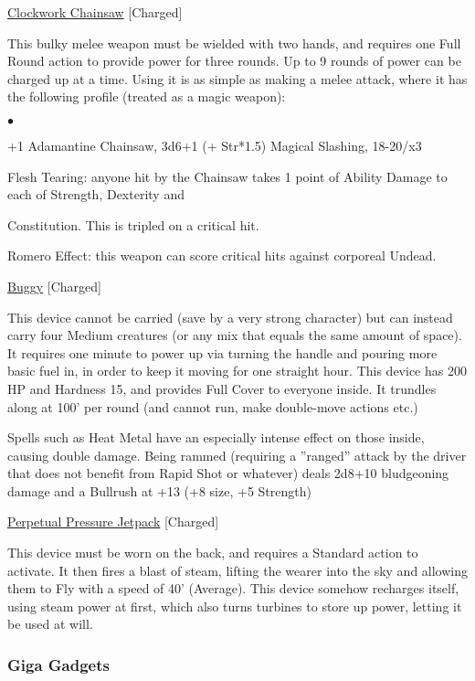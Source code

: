 \medskip\noindent\underline{Clockwork Chainsaw} [Charged] 

\noindent This bulky melee weapon must be wielded with two hands, and requires one Full Round action to provide power for three rounds. Up to 9 rounds of power can be charged up at a time. Using it is as simple as making a melee attack, where it has the following profile (treated as a magic weapon): 

\begin{list}{$\bullet$}{\itemspace}
\item +1 Adamantine Chainsaw, 3d6+1 (+ Str*1.5) Magical Slashing, 18-20/x3 
\item Flesh Tearing: anyone hit by the Chainsaw takes 1 point of Ability Damage to each of Strength, Dexterity and \item Constitution. This is tripled on a critical hit. 
\item Romero Effect: this weapon can score critical hits against corporeal Undead. 
\end{list}

\medskip\noindent\underline{Buggy} [Charged] 

\noindent This device cannot be carried (save by a very strong character) but can instead carry four Medium creatures (or any mix that equals the same amount of space). It requires one minute to power up via turning the handle and pouring more basic fuel in, in order to keep it moving for one straight hour. This device has 200 HP and Hardness 15, and provides Full Cover to everyone inside. It trundles along at 100' per round (and cannot run, make double-move actions etc.) 

\smallskip\noindent Spells such as Heat Metal have an especially intense effect on those inside, causing double damage. Being rammed (requiring a ''ranged'' attack by the driver that does not benefit from Rapid Shot or whatever) deals 2d8+10 bludgeoning damage and a Bullrush at +13 (+8 size, +5 Strength) 

\medskip\noindent\underline{Perpetual Pressure Jetpack} [Charged] 

\noindent This device must be worn on the back, and requires a Standard action to activate. It then fires a blast of steam, lifting the wearer into the sky and allowing them to Fly with a speed of 40' (Average). This device somehow recharges itself, using steam power at first, which also turns turbines to store up power, letting it be used at will. 

\subsubsection{Giga Gadgets}

